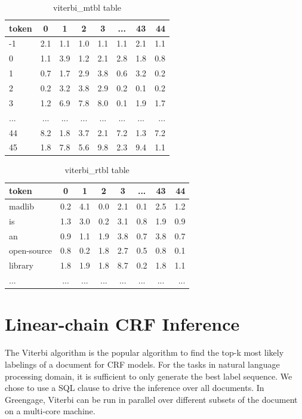 \begin{itemize}
\begin {table}[h]
\caption {viterbi\_mtbl table} \label{tab:viterbimtbl}
 \begin{center}
  \begin{tabular}{l*{6}{c}r}
   token             & 0   & 1   & 2   & 3   & ... & 43 &  44 \\
   \hline
  -1                 & 2.1 & 1.1 & 1.0 & 1.1 & 1.1 & 2.1 & 1.1  \\
   0                 & 1.1 & 3.9 & 1.2 & 2.1 & 2.8 & 1.8 & 0.8  \\
   1                 & 0.7 & 1.7 & 2.9 & 3.8 & 0.6 & 3.2 & 0.2  \\
   2                 & 0.2 & 3.2 & 3.8 & 2.9 & 0.2 & 0.1 & 0.2  \\
   3                 & 1.2 & 6.9 & 7.8 & 8.0 & 0.1 & 1.9 & 1.7  \\
   ...               & ... & ... & ... & ... & ... & ... & ...  \\
   44                & 8.2 & 1.8 & 3.7 & 2.1 & 7.2 & 1.3 & 7.2  \\
   45                & 1.8 & 7.8 & 5.6 & 9.8 & 2.3 & 9.4 & 1.1
  \end{tabular}
 \end{center}
\end{table}
\begin {table}[h]
\caption {viterbi\_rtbl table} \label{tab:viterbirtbl}
 \begin{center}
  \begin{tabular}{l*{6}{c}r}
   token             & 0   & 1   & 2   & 3   & ... & 43 &  44 \\
   \hline
   madlib            & 0.2 & 4.1 & 0.0 & 2.1 & 0.1 & 2.5 & 1.2  \\
   is                & 1.3 & 3.0 & 0.2 & 3.1 & 0.8 & 1.9 & 0.9  \\
   an                & 0.9 & 1.1 & 1.9 & 3.8 & 0.7 & 3.8 & 0.7  \\
   open-source       & 0.8 & 0.2 & 1.8 & 2.7 & 0.5 & 0.8 & 0.1  \\
   library           & 1.8 & 1.9 & 1.8 & 8.7 & 0.2 & 1.8 & 1.1  \\
   ...               & ... & ... & ... & ... & ... & ... & ...  \\
  \end{tabular}
 \end{center}
\end{table}
\end{itemize}

\section{Linear-chain CRF Inference}
The Viterbi algorithm \cite{DBLP:journals/scholarpedia/Viterbi09} is the popular algorithm to find the top-k most likely labelings of a document for CRF models.
For the tasks in natural language processing domain, it is sufficient to only generate the best label sequence.
We chose to use a SQL clause to drive the inference over all documents.
In Greengage, Viterbi can be run in parallel over different subsets of the document on a multi-core machine.

